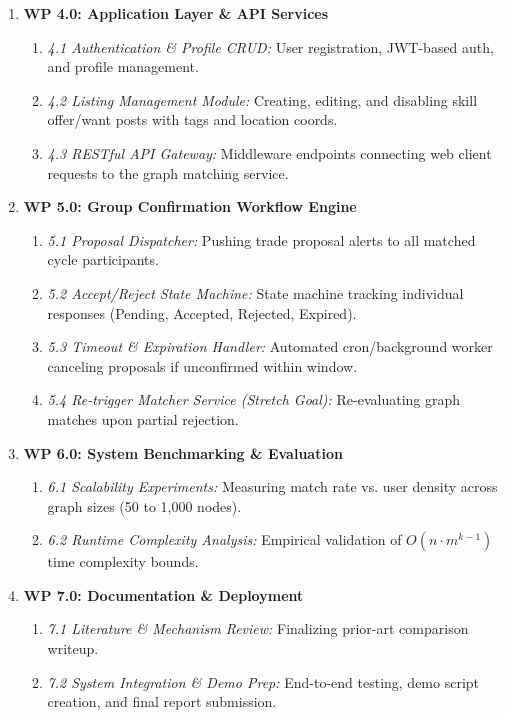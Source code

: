 \begin{enumerate}
    \item \textbf{WP 4.0: Application Layer \& API Services}
    \begin{enumerate}
        \item \textit{4.1 Authentication \& Profile CRUD:} User registration, JWT-based auth, and profile management.
        \item \textit{4.2 Listing Management Module:} Creating, editing, and disabling skill offer/want posts with tags and location coords.
        \item \textit{4.3 RESTful API Gateway:} Middleware endpoints connecting web client requests to the graph matching service.
    \end{enumerate}

    \item \textbf{WP 5.0: Group Confirmation Workflow Engine}
    \begin{enumerate}
        \item \textit{5.1 Proposal Dispatcher:} Pushing trade proposal alerts to all matched cycle participants.
        \item \textit{5.2 Accept/Reject State Machine:} State machine tracking individual responses (Pending, Accepted, Rejected, Expired).
        \item \textit{5.3 Timeout \& Expiration Handler:} Automated cron/background worker canceling proposals if unconfirmed within window.
        \item \textit{5.4 Re-trigger Matcher Service (Stretch Goal):} Re-evaluating graph matches upon partial rejection.
    \end{enumerate}

    \item \textbf{WP 6.0: System Benchmarking \& Evaluation}
    \begin{enumerate}
        \item \textit{6.1 Scalability Experiments:} Measuring match rate vs. user density across graph sizes (50 to 1,000 nodes).
        \item \textit{6.2 Runtime Complexity Analysis:} Empirical validation of $O(n \cdot m^{k-1})$ time complexity bounds.
    \end{enumerate}

    \item \textbf{WP 7.0: Documentation \& Deployment}
    \begin{enumerate}
        \item \textit{7.1 Literature \& Mechanism Review:} Finalizing prior-art comparison writeup.
        \item \textit{7.2 System Integration \& Demo Prep:} End-to-end testing, demo script creation, and final report submission.
    \end{enumerate}
\end{enumerate}

